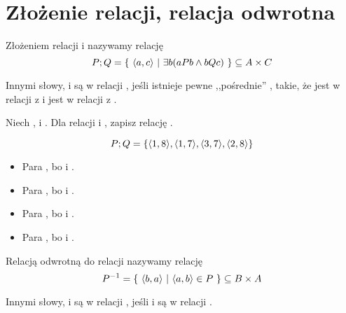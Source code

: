 \section{Złożenie relacji, relacja odwrotna}

\begin{definition}
Złożeniem relacji  i  nazywamy relację 
\[
    P;Q = \{\ \langle a,c \rangle\ |\ \exists{b}(aPb \wedge bQc)\ \} \subseteq A\times C
\]
\end{definition}

Innymi słowy,  i  są w relacji , jeśli istnieje pewne ,,pośrednie'' , takie, że  jest w relacji  z  i  jest w relacji  z .

\begin{example}
\label{example:composition}
Niech ,  i . Dla relacji  i  , zapisz relację .


\[
 P;Q = \{ \langle 1,8 \rangle, \langle 1,7 \rangle, \langle 3,7 \rangle, \langle 2,8 \rangle \}
\]
\begin{itemize}
    \item Para , bo  i .  
    \item Para , bo  i .
    \item Para , bo  i .
    \item Para , bo  i .    
\end{itemize}

\end{example}

\begin{definition}
Relacją odwrotną do relacji  nazywamy relację 
\[
    P^{-1} = \{\ \langle b,a \rangle\ |\  \langle a,b \rangle \in P \ \} \subseteq B\times A
\]
\end{definition}

Innymi słowy,  i  są w relacji , jeśli  i  są w relacji .

